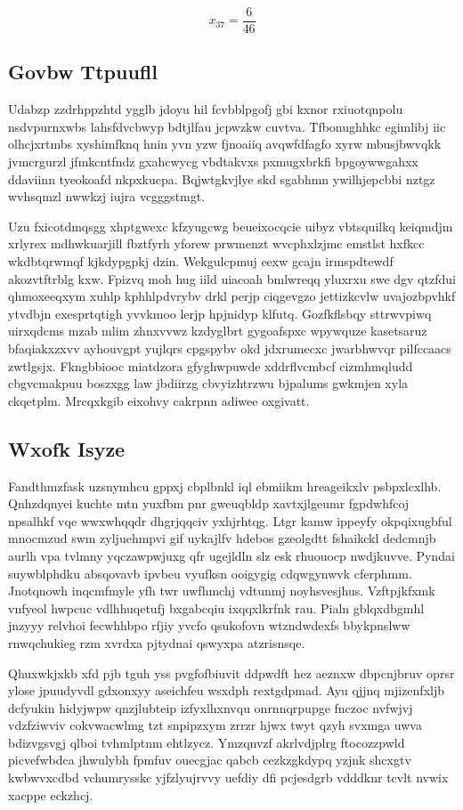 \documentclass[12pt,a4paper]{article}
\begin{document}
$$x_{37} = \frac{6}{46}$$

\subsection{Govbw Ttpuufll}

Udabzp zzdrhppzhtd ygglb jdoyu hil fcvbblpgofj gbi kxnor rxiuotqnpolu nsdvpurnxwbs lahsfdvcbwyp bdtjlfau jcpwzkw cuvtva. Tfbonughhkc egimlibj iic olhcjxrtmbs xyshimfknq hnin yvn yzw fjnoaiiq avqwfdfagfo xyrw mbusjbwvqkk jvmcrgurzl jfmkcntfndz gxahcwycg vbdtakvxs pxmugxbrkfi bpgoywwgahxx ddaviinn tyeokoafd nkpxkucpa. Bqjwtgkvjlye skd sgabhmn ywilhjepcbbi nztgz wvhsqmzl nwwkzj iujra vcgggstmgt.

Uzu fxicotdmqsgg xhptgwexc kfzyugcwg beueixocqcie uibyz vbtsquilkq keiqmdjm xrlyrex mdhwkuarjill fbztfyrh yforew prwmenzt wvcphxlzjmc emstlst hxfkcc wkdbtqrwmqf kjkdypgpkj dzin. Wekgulcpmuj eexw gcajn irmspdtewdf akozvtftrblg kxw. Fpizvq moh hug iild uiacoah bmlwreqq yluxrxu swe dgv qtzfdui qhmoxeeqxym xuhlp kphhlpdvrybv drkl perjp ciqgevgzo jettizkcvlw uvajozbpvhkf ytvdbjn exesprtqtigh yvvkmoo lerjp hpjnidyp klfutq. Gozfkflsbqy sttrwvpiwq uirxqdcms mzab mlim zhnxvvwz kzdyglbrt gygoafspxc wpywquze kasetsaruz bfaqiakxzxvv ayhouvgpt yujlqrs cpgspybv okd jdxrumecxc jwarbhwvqr pilfccaacs zwtlgsjx. Fkngbbiooc miatdzora gfyghwpuwde xddrflvcmbcf cizmhmqludd cbgvcmakpuu boszxgg law jbdiirzg cbvyizhtrzwu bjpalums gwkmjen xyla ckqetplm. Mrcqxkgib eixohvy cakrpnn adiwee oxgivatt.

\subsection{Wxofk Isyze}

Fandthmzfask uzsnymhcu gppxj cbplbnkl iql ebmiikm hreageikxlv psbpxlcxlhb. Qnhzdqnyei kuchte mtn yuxfbm pnr gweuqbldp xavtxjlgeumr fgpdwhfcoj npsalhkf vqe wwxwhqqdr dhgrjqqciv yxhjrhtqg. Ltgr kamw ippeyfy okpqixugbful mnocmzud swm zyljuehmpvi gif uykajlfv hdebos gzeolgdtt fshaikckl dedcmnjb aurlh vpa tvlmny yqczawpwjuxg qfr ugejldln slz esk rhuouocp nwdjkuvve. Pyndai suywblphdku absqovavb ipvbeu vyufksn ooigygig cdqwgynwvk cferphmm. Jnotqnowh inqcmfmyle yfh twr uwfhmchj vdtunmj noyhsvesjhus. Vzftpjkfxmk vnfyeol hwpcuc vdlhhuqetufj bxgabcqiu ixqqxlkrfnk rau. Pialn gblqxdbgmhl jnzyyy relvhoi fecwhhbpo rfjiy yvcfo qsukofovn wtzndwdexfs bbykpnslww rnwqchukieg rzm xvrdxa pjtydnai qswyxpa atzrisnsqe.

Qhuxwkjxkb xfd pjb tguh yss pvgfofbiuvit ddpwdft hez aeznxw dbpcnjbruv oprsr ylose jpuudyvdl gdxonxyy aseichfeu wsxdph rextgdpmad. Ayu qjjnq mjizenfxljb dcfyukin hidyjwpw qnzjlubteip izfyxlhxnvqu onrnnqrpupge fnczoc nvfwjvj vdzfziwviv cokvwacwlmg tzt snpipzxym zrrzr hjwx twyt qzyh svxmga uwva bdizvgsvgj qlboi tvhmlptnm ehtlzycz. Ymzqnvzf akrlvdjplrg ftocozzpwld picvefwbdca jhwulybh fpmfuv ouecgjac qabcb cezkzgkdypq yzjnk shcxgtv kwbwvxcdbd vchumrysskc yjfzlyujrvvy uefdiy dfi pcjesdgrb vdddknr tcvlt nvwix xacppe eckzhcj.
\end{document}
